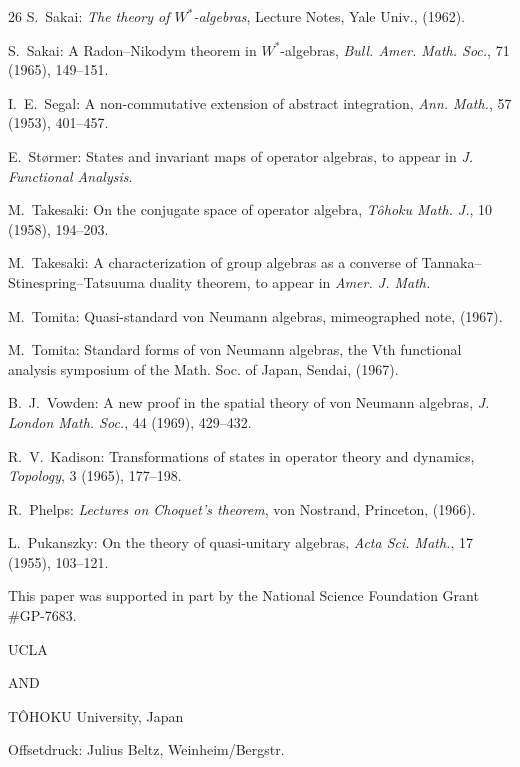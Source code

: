 \documentclass[12pt,b5paper,twoside]{article}
\theoremstyle{takesaki}
\numberwithin{equation}{section}
\begin{document}
\begin{thebibliography}{26}
S.~Sakai:
\emph{The theory of $W^*$-algebras}, Lecture Notes, Yale Univ., (1962).

S.~Sakai:
A Radon--Nikodym theorem in $W^*$-algebras,
\emph{Bull. Amer. Math. Soc.}, 71 (1965), 149--151.

I.~E.~Segal:
A non-commutative extension of abstract integration,
\emph{Ann. Math.}, 57 (1953), 401--457.

E.~St{\o}rmer:
States and invariant maps of operator algebras, to appear in
\emph{J. Functional Analysis}.

M.~Takesaki:
On the conjugate space of operator algebra,
\emph{T\^ohoku Math. J.}, 10 (1958), 194--203.

M.~Takesaki:
A characterization of group algebras as a converse of
Tannaka--Stinespring--Tatsuuma duality theorem, to appear in
\emph{Amer. J. Math.}

M.~Tomita:
Quasi-standard von Neumann algebras, mimeographed note, (1967).

M.~Tomita:
Standard forms of von Neumann algebras, the Vth functional analysis
symposium of the Math. Soc. of Japan, Sendai, (1967).

B.~J.~Vowden:
A new proof in the spatial theory of von Neumann algebras,
\emph{J. London Math. Soc.}, 44 (1969), 429--432.

R.~V.~Kadison:
Transformations of states in operator theory and dynamics,
\emph{Topology}, 3 (1965), 177--198.

R.~Phelps:
\emph{Lectures on Choquet's theorem}, von Nostrand, Princeton, (1966).

L.~Pukanszky:
On the theory of quasi-unitary algebras, \emph{Acta Sci. Math.},
17 (1955), 103--121.

\end{thebibliography}

\bigskip
This paper was supported in part by the National Science Foundation
Grant \#GP-7683.

\bigskip
\noindent UCLA

\medskip
\noindent AND

\medskip
\noindent T\^OHOKU University, Japan

\vfill
\begin{center}
\small Offsetdruck: Julius Beltz, Weinheim/Bergstr.
\end{center}
\end{document}
